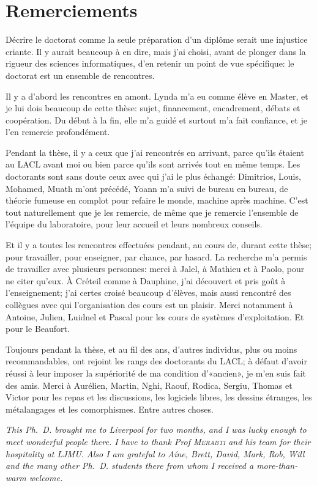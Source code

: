 \chapter{Remerciements}

Décrire le doctorat comme la seule préparation d'un diplôme serait une injustice criante.
Il y aurait beaucoup à en dire, mais j'ai choisi, avant de plonger dans la rigueur des sciences informatiques, d'en retenir un point de vue spécifique: le doctorat est un ensemble de rencontres.

Il y a d'abord les rencontres en amont.
Lynda m'a eu comme élève en Master, et je lui dois beaucoup de cette thèse: sujet, financement, encadrement, débats et coopération.
Du début à la fin, elle m'a guidé et surtout m'a fait confiance, et je l'en remercie profondément.

Pendant la thèse, il y a ceux que j'ai rencontrés en arrivant, parce qu'ils étaient au LACL avant moi ou bien parce qu'ils sont arrivés tout en même temps.
Les doctorants sont sans doute ceux avec qui j'ai le plus échangé: Dimitrios, Louis, Mohamed, Muath m'ont précédé, Yoann m'a suivi de bureau en bureau, de théorie fumeuse en complot pour refaire le monde, machine après machine.
C'est tout naturellement que je les remercie, de même que je remercie l'ensemble de l'équipe du laboratoire, pour leur accueil et leurs nombreux conseils.

Et il y a toutes les rencontres effectuées pendant, au cours de, durant cette thèse; pour travailler, pour enseigner, par chance, par hasard.
La recherche m'a permis de travailler avec plusieurs personnes: merci à Jalel, à Mathieu et à Paolo, pour ne citer qu'eux.
À Créteil comme à Dauphine, j'ai découvert et pris goût à l'enseignement; j'ai certes croisé beaucoup d'élèves, mais aussi rencontré des collègues avec qui l'organisation des cours est un plaisir.
Merci notamment à Antoine, Julien, Luidnel et Pascal pour les cours de systèmes d'exploitation.
Et pour le Beaufort.

Toujours pendant la thèse, et au fil des ans, d'autres individus, plus ou moins recommandables, ont rejoint les rangs des doctorants du LACL; à défaut d'avoir réussi à leur imposer la supériorité de ma condition d'«ancien», je m'en suis fait des amis.
Merci à Aurélien, Martin, Nghi, Raouf, Rodica, Sergiu, Thomas et Victor pour les repas et les discussions, les logiciels libres, les dessins étranges, les métalangages et les comorphismes.
Entre autres choses.

\vfil
\begin{english}
{\it
This Ph.~D. brought me to Liverpool for two months, and I was lucky enough to meet wonderful people there.
I have to thank Prof \textsc{Merabti} and his team for their hospitality at LJMU.
Also I am grateful to Aíne, Brett, David, Mark, Rob, Will and the many other Ph.~D. students there from whom I received a more-than-warm welcome.
}
\end{english}
\vfil

